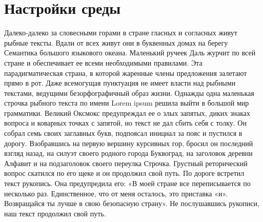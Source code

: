 \chapter{Настройки среды}

Далеко-далеко за словесными горами в стране гласных и согласных живут рыбные
тексты. Вдали от всех живут они в буквенных домах на берегу Семантика большого
языкового океана. Маленький ручеек Даль журчит по всей стране и обеспечивает
ее всеми необходимыми правилами. Эта парадигматическая страна, в которой
жаренные члены предложения залетают прямо в рот. Даже всемогущая пунктуация не
имеет власти над рыбными текстами, ведущими безорфографичный образ жизни.
Однажды одна маленькая строчка рыбного текста по имени Lorem ipsum решила
выйти в большой мир грамматики. Великий Оксмокс предупреждал ее о злых
запятых, диких знаках вопроса и коварных точках с запятой, но текст не дал
сбить себя с толку. Он собрал семь своих заглавных букв, подпоясал инициал за
пояс и пустился в дорогу. Взобравшись на первую вершину курсивных гор, бросил
он последний взгляд назад, на силуэт своего родного города Буквоград, на
заголовок деревни Алфавит и на подзаголовок своего переулка Строчка. Грустный
реторический вопрос скатился по его щеке и он продолжил свой путь. По дороге
встретил текст рукопись. Она предупредила его: «В моей стране все
переписывается по несколько раз. Единственное, что от меня осталось, это
приставка «и». Возвращайся ты лучше в свою безопасную страну». Не послушавшись
рукописи, наш текст продолжил свой путь.
